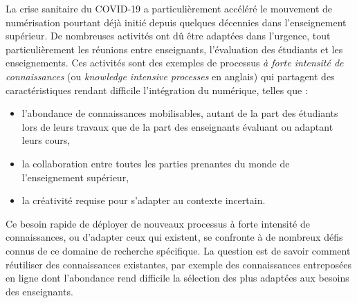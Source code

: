 

\pagestyle{empty}


\begin{footnotesize}

\hspace{0pt}
\vfill


\begin{center}

\textbf{\@title}

\textbf{\textit{\@subtitle}}

\end{center}



La crise sanitaire du COVID-19 a particulièrement accéléré le mouvement de numérisation pourtant déjà initié depuis quelques décennies dans l'enseignement supérieur.
De nombreuses activités ont dû être adaptées dans l'urgence, tout particulièrement les réunions entre enseignants, l'évaluation des étudiants et les enseignements.
Ces activités sont des exemples de processus \og \textit{à forte intensité de connaissances} \fg (ou \og \textit{knowledge intensive processes} \fg en anglais) qui partagent des caractéristiques rendant difficile l'intégration du numérique, telles que :
\begin{itemize}
\item l'abondance de connaissances mobilisables, autant de la part des étudiants lors de leurs travaux que de la part des enseignants évaluant ou adaptant leurs cours,
\item la collaboration entre toutes les parties prenantes du monde de l'enseignement supérieur,
\item la créativité requise pour s'adapter au contexte incertain.
\end{itemize}
Ce besoin rapide de déployer de nouveaux processus à forte intensité de connaissances, ou d'adapter ceux qui existent, se confronte à de nombreux défis connus de ce domaine de recherche spécifique.
La question est de savoir comment réutiliser des connaissances existantes, par exemple des connaissances entreposées en ligne dont l'abondance rend difficile la sélection des plus adaptées aux besoins des enseignants.


\end{footnotesize}
